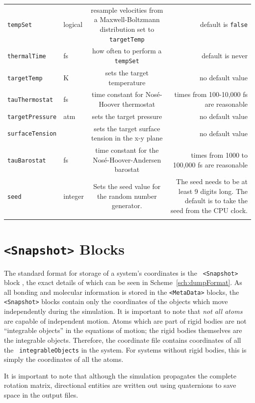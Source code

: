 \documentclass[letterpaper]{report}
\begin{document}
\begin{longtable}[c]{ABCD}
{\tt tempSet} & logical & resample velocities from a Maxwell-Boltzmann
distribution set to {\tt targetTemp} & default is {\tt false} \\
{\tt thermalTime} & fs & how often to perform a {\tt tempSet} &
default is never \\
{\tt targetTemp} & K & sets the target temperature & no default value \\
{\tt tauThermostat} & fs & time constant for Nos\'{e}-Hoover
thermostat & times from 100-10,000 fs are reasonable \\
{\tt targetPressure} & atm & sets the target pressure & no default value\\
{\tt surfaceTension} &  & sets the target surface tension in the x-y
plane & no default value \\
{\tt tauBarostat} & fs & time constant for the
Nos\'{e}-Hoover-Andersen barostat & times from 1000 to 100,000 fs
are reasonable \\
{\tt seed } & integer & Sets the seed value for the random number generator. & The seed needs to be at least 9 digits long. The default is to take the seed from the CPU clock. \\
\label{table:genParams}
\end{longtable}


\section{\label{section:coordFiles}{\tt <Snapshot>} Blocks}

The standard format for storage of a system's coordinates is the {\tt
<Snapshot>} block , the exact details of which can be seen in
Scheme~\ref{sch:dumpFormat}. As all bonding and molecular information
is stored in the {\tt <MetaData>} blocks, the {\tt <Snapshot>} blocks
contain only the coordinates of the objects which move independently
during the simulation.  It is important to note that {\it not all
atoms} are capable of independent motion.  Atoms which are part of
rigid bodies are not ``integrable objects'' in the equations of
motion; the rigid bodies themselves are the integrable objects.
Therefore, the coordinate file contains coordinates of all the {\tt
integrableObjects} in the system.  For systems without rigid bodies,
this is simply the coordinates of all the atoms.

It is important to note that although the simulation propagates the
complete rotation matrix, directional entities are written out using
quaternions to save space in the output files.
\end{document}
